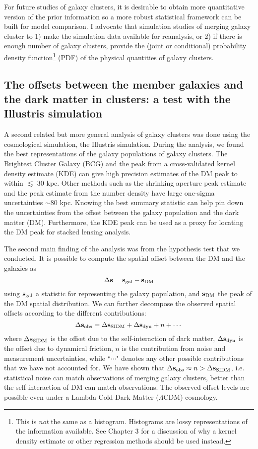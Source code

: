 For future studies of galaxy clusters, 
it is desirable to obtain more quantitative version of the 
prior information so a more robust statistical framework can be built for model
comparison. 
I advocate that simulation studies of merging galaxy cluster  
to 1) make the simulation data available for reanalysis, or 2) if there is
enough number of galaxy clusters, provide the
(joint or conditional) probability density function\footnote{This is {\it not}
the same as a histogram. Histograms are lossy representations of the information 
available. See Chapter 3 for a discussion of why a kernel density estimate or
other regression methods should be used instead.} (PDF) of the physical quantities
of galaxy clusters. 

\subsection{The offsets between the member galaxies and the dark
matter in clusters: a test with the Illustris simulation}
A second related but more general analysis of galaxy clusters was done using the
cosmological simulation, the Illustris simulation. 
During the analysis, we found the best 
representations of the galaxy populations of galaxy clusters. 
The Brightest Cluster
Galaxy (BCG) and the peak from a cross-validated kernel density estimate (KDE)
can give high precision estimates of the DM peak to within $\lesssim$ 30 kpc.
Other methods such as the shrinking aperture peak estimate and the peak estimate 
from the number density have large one-sigma uncertainties $\sim 80$ kpc.   
Knowing the best summary statistic can help pin down the uncertainties from  
the offset between the galaxy population and the dark matter (DM). Furthermore,
the KDE peak can be used as a proxy for locating the DM peak for stacked
lensing analysis.  

The second main finding of the analysis was from the hypothesis test that we
conducted.
It is possible to compute the spatial 
offset between the DM and the galaxies as 
\begin{equation}
	\Delta {\bf s} =  {\bf s}_{\rm gal} - {\bf s}_{\rm DM}
\end{equation}
using ${\bf s}_{\rm gal}$ a statistic for representing the galaxy population,
and ${\bf s}_{\rm DM}$ the peak of the DM spatial distribution.
We can further decompose the observed spatial offsets according to the different
contributions: 
\begin{equation}
	\Delta {\bf s}_{\rm obs} = \Delta {\bf s}_{\mathrm{SIDM}} + \Delta {\bf s}_{\rm dyn} + n + \cdots
\end{equation}
where $\Delta {\bf s}_{\mathrm{SIDM}}$ is the offset due to the self-interaction of dark matter, 
$\Delta {\bf s}_{\rm dyn}$ is the offset due to dynamical friction, $n$ is the
contribution from noise and measurement uncertainties, while ``$\cdots$" denotes
any other possible contributions that we have not accounted for. 
We have shown that $\Delta {\bf s}_{\rm obs} \approx  n  > \Delta {\bf s}_{\mathrm{SIDM}}$, i.e. 
statistical noise can match observations of merging galaxy clusters, better than 
the self-interaction of DM can match observations. 
The observed offset levels are possible even under  
a Lambda Cold Dark Matter ($\Lambda$CDM) cosmology. 

